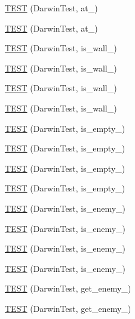 \begin{DoxyCompactItemize}
\item 
\hyperlink{TestDarwin_8c_09_09_a9f888a3b2420490794c62e6140126cde}{T\-E\-S\-T} (Darwin\-Test, at\-\_)
\item 
\hyperlink{TestDarwin_8c_09_09_a11fb23f302b7127df55f1676d7463909}{T\-E\-S\-T} (Darwin\-Test, at\-\_)
\item 
\hyperlink{TestDarwin_8c_09_09_a2eac00cac3740c46f8e04084ec13be9e}{T\-E\-S\-T} (Darwin\-Test, is\-\_\-wall\-\_)
\item 
\hyperlink{TestDarwin_8c_09_09_a549b9c45d4a090d21743dbcfba509063}{T\-E\-S\-T} (Darwin\-Test, is\-\_\-wall\-\_)
\item 
\hyperlink{TestDarwin_8c_09_09_aa2c87df8d5a40dba3dbdad22562cec01}{T\-E\-S\-T} (Darwin\-Test, is\-\_\-wall\-\_)
\item 
\hyperlink{TestDarwin_8c_09_09_a467ed3a8b2ecaf19301bee31a5ae8769}{T\-E\-S\-T} (Darwin\-Test, is\-\_\-wall\-\_)
\item 
\hyperlink{TestDarwin_8c_09_09_a1822db8d1834a8bb7351923da5bc362a}{T\-E\-S\-T} (Darwin\-Test, is\-\_\-empty\-\_)
\item 
\hyperlink{TestDarwin_8c_09_09_a971212e8bb67e78f4b227c4e9cb8d2ae}{T\-E\-S\-T} (Darwin\-Test, is\-\_\-empty\-\_)
\item 
\hyperlink{TestDarwin_8c_09_09_a7880c0f0459d82064be26563ee2a1854}{T\-E\-S\-T} (Darwin\-Test, is\-\_\-empty\-\_)
\item 
\hyperlink{TestDarwin_8c_09_09_abd26c32c2b00538611a434f89eb7ef09}{T\-E\-S\-T} (Darwin\-Test, is\-\_\-empty\-\_)
\item 
\hyperlink{TestDarwin_8c_09_09_ae7368b2dfe9c41fb97429208cbf91826}{T\-E\-S\-T} (Darwin\-Test, is\-\_\-enemy\-\_)
\item 
\hyperlink{TestDarwin_8c_09_09_ab4aec652af6b49784d673a5f662fbadb}{T\-E\-S\-T} (Darwin\-Test, is\-\_\-enemy\-\_)
\item 
\hyperlink{TestDarwin_8c_09_09_a3c0f6fa58dfe8e78ffed895b7a9a99d4}{T\-E\-S\-T} (Darwin\-Test, is\-\_\-enemy\-\_)
\item 
\hyperlink{TestDarwin_8c_09_09_a417e9c5dba1f185b20f897bdbcb6fd0e}{T\-E\-S\-T} (Darwin\-Test, is\-\_\-enemy\-\_)
\item 
\hyperlink{TestDarwin_8c_09_09_a75763fa7bfb1e541b06769dd567615bf}{T\-E\-S\-T} (Darwin\-Test, get\-\_\-enemy\-\_)
\item 
\hyperlink{TestDarwin_8c_09_09_a2104dfd1fcac24c1489df79b3ae77ce9}{T\-E\-S\-T} (Darwin\-Test, get\-\_\-enemy\-\_)
\item 

\end{DoxyCompactItemize}
